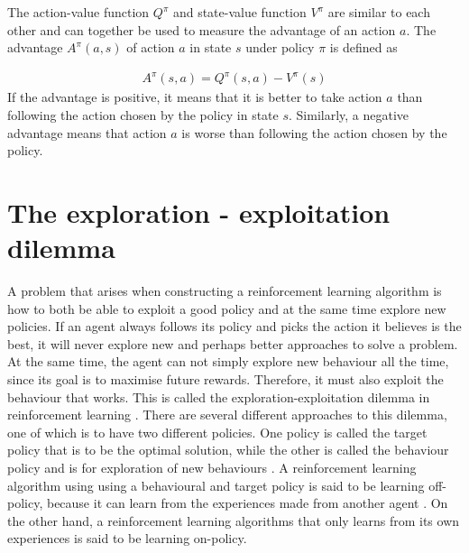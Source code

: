 \documentclass[class=book, crop=false, 11pt]{standalone}
\begin{document}
The action-value function $Q^{\pi}$ and state-value function $V^{\pi}$ are similar to each other and can together be used to measure the advantage of an action $a$. The advantage $A^{\pi}(a,s)$ of action $a$ in state $s$ under policy $\pi$ is defined as 

\begin{equation}
   \begin{aligned}\label{eq:theory:advantage_function}
A^{\pi}(s,a) =  Q^{\pi}(s,a) - V^{\pi}(s)
\end{aligned} 
\end{equation}
If the advantage is positive, it means that it is better to take action $a$ than following the action chosen by the policy in state $s$. Similarly, a negative advantage means that action $a$ is worse than following the action chosen by the policy.

\section{The exploration - exploitation dilemma}
A problem that arises when constructing a reinforcement learning algorithm is how to both be able to exploit a good policy and at the same time explore new policies. If an agent always follows its policy and picks the action it believes is the best, it will never explore new and perhaps better approaches to solve a problem. At the same time, the agent can not simply explore new behaviour all the time, since its goal is to maximise future rewards. Therefore, it must also exploit the behaviour that works. This is called the exploration-exploitation dilemma in reinforcement learning \cite{Sutton1998}. There are several different approaches to this dilemma, one of which is to have two different policies. One policy is called the target policy that is to be the optimal solution, while the other is called the behaviour policy and is for exploration of new behaviours \cite{Sutton1998}. A reinforcement learning algorithm using using a behavioural and target policy is said to be learning off-policy, because it can learn from the experiences made from another agent \cite{Sutton1998}. On the other hand, a reinforcement learning algorithms that only learns from its own experiences is said to be learning on-policy.
\end{document}
